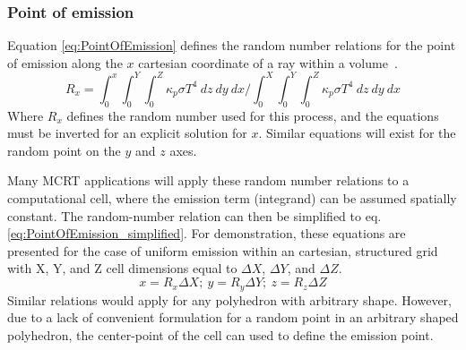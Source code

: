 \subsubsection{Point of emission}
Equation \ref{eq:PointOfEmission} defines the random number relations for the point of emission along the $x$ cartesian coordinate of a ray within a volume~\cite{Modest2013RadiativeTransferb}.
\begin{equation}
    R_x=\int^x_0{\int^Y_0{\int^Z_0{\kappa{}_p\sigma{}T^4~dz}~dy}~dx}\bigg/\int^X_0{\int^Y_0{\int^Z_0{\kappa{}_p\sigma{}T^4~dz}~dy}~dx}
    \label{eq:PointOfEmission}
\end{equation}
Where $R_x$ defines the random number used for this process, and the equations must be inverted for an explicit solution for $x$. Similar equations will exist for the random point on the $y$ and $z$ axes.

Many MCRT applications will apply these random number relations to a computational cell, where the emission term (integrand) can be assumed spatially constant. 
The random-number relation can then be simplified to eq. \ref{eq:PointOfEmission_simplified}. For demonstration, these equations are presented for the case of uniform emission within an cartesian, structured grid with X, Y, and Z cell dimensions equal to $\Delta{}X$, $\Delta{}Y$, and $\Delta{}Z$. 
\begin{equation}
    x = R_x\Delta{X};~ y = R_y\Delta{Y};~z = R_z\Delta{Z}
    \label{eq:PointOfEmission_simplified}
\end{equation}
Similar relations would apply for any polyhedron with arbitrary shape. However, due to a lack of convenient formulation for a random point in an arbitrary shaped polyhedron, the center-point of the cell can used to define the emission point.

